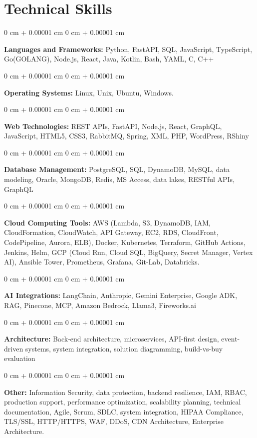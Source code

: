 \documentclass[10pt, letterpaper]{article}
\newenvironment{onecolentry}{
    \begin{adjustwidth}{
        0 cm + 0.00001 cm
    }{
        0 cm + 0.00001 cm
    }
}{
    \end{adjustwidth}
} %
\begin{document}
    \section{Technical Skills}
    \vspace{2 pt }
    \begin{onecolentry}
    \textbf{Languages and Frameworks:} Python, FastAPI, SQL, JavaScript, TypeScript, Go(GOLANG), Node.js, React, Java, Kotlin, Bash, YAML, C, C++
    \end{onecolentry}
    \begin{onecolentry}
        \textbf{Operating Systems:} Linux, Unix, Ubuntu, Windows.
    \end{onecolentry}
    \begin{onecolentry}
         \textbf{Web Technologies:} REST APIs, FastAPI, Node.js, React, GraphQL, JavaScript, HTML5, CSS3, RabbitMQ, Spring, XML, PHP, WordPress, RShiny
    \end{onecolentry}
    \begin{onecolentry}
        \textbf{Database Management:} PostgreSQL, SQL, DynamoDB, MySQL, data modeling, Oracle, MongoDB, Redis, MS Access, data lakes, RESTful APIs, GraphQL
    \end{onecolentry}
    \begin{onecolentry}
        \textbf{Cloud Computing Tools:}
AWS (Lambda, S3, DynamoDB, IAM, CloudFormation, CloudWatch, API Gateway, EC2, RDS, CloudFront, CodePipeline, Aurora, ELB), Docker, Kubernetes, Terraform, GitHub Actions, Jenkins, Helm, GCP (Cloud Run, Cloud SQL, BigQuery, Secret Manager, Vertex AI), Ansible Tower, Prometheus, Grafana, Git-Lab, Databricks.
    \end{onecolentry}
    \begin{onecolentry}
         \textbf{AI Integrations:} LangChain, Anthropic, Gemini Enterprise, Google ADK, RAG, Pinecone, MCP, Amazon Bedrock, Llama3, Fireworks.ai
    \end{onecolentry}
    \begin{onecolentry}
        \textbf{Architecture:} Back-end architecture, microservices, API-first design, event-driven systems, system integration, solution diagramming, build-vs-buy evaluation
    \end{onecolentry}
        \begin{onecolentry}
     \textbf{Other:} Information Security, data protection, backend resilience, IAM, RBAC, production support, performance optimization, scalability planning, technical documentation, Agile, Scrum, SDLC, system integration, HIPAA Compliance, TLS/SSL, HTTP/HTTPS, WAF, DDoS, CDN Architecture, Enterprise Architecture.
    \end{onecolentry}
\end{document}
